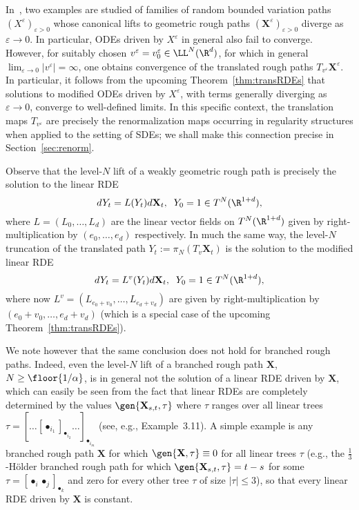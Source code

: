\documentclass{article}
\begin{document}
\begin{remark}\label{remark:BCF}
In~\cite{BCFForth}, two examples are studied of families of random bounded variation paths $(X^\varepsilon)_{\varepsilon > 0}$ whose canonical lifts to geometric rough paths $(\mathbf{X}^\varepsilon)_{\varepsilon > 0}$ diverge as $\varepsilon \rightarrow 0$. In particular, ODEs driven by $X^\varepsilon$ in general also fail to converge. However, for suitably chosen $v^\varepsilon = v^\varepsilon_0 \in \LL^N(\R^{d})$, for which in general $\lim_{\varepsilon\rightarrow 0}|v^\varepsilon| = \infty$, one obtains convergence of the translated rough paths $T_{v^\varepsilon}\mathbf{X}^\varepsilon$. In particular, it follows from the upcoming Theorem~\ref{thm:transRDEs} that solutions to modified ODEs driven by $X^\varepsilon$, with terms generally diverging as $\varepsilon \rightarrow 0$, converge to well-defined limits. In this specific context, the translation maps $T_{v^\varepsilon}$ are precisely the renormalization maps occurring in regularity structures when applied to the setting of SDEs; we shall make this connection precise in Section~\ref{sec:renorm}.
\end{remark}


\begin{remark}
Observe that the level-$N$ lift of a weakly geometric rough path is precisely the solution to the linear RDE
\[
dY_t = L(Y_t)d\mathbf{X}_t, \; \; Y_0 = 1 \in T^N(\R^{1+d}),
\]
where $L = (L_0,\ldots,L_d)$ are the linear vector fields on $T^N(\R^{1+d})$ given by right-multiplication by $(e_0,\ldots, e_d)$ respectively.
In much the same way, the level-$N$ truncation of the translated path $Y_t := \pi_N(T_v\mathbf{X}_t)$ is the solution to the modified linear RDE 
\[
dY_t = L^v(Y_t) d\mathbf{X}_t, \; \; Y_0 = 1 \in T^N(\R^{1+d}),
\]
where now $L^v = (L_{e_0 + v_0},\ldots,L_{e_d + v_d})$ are given by right-multiplication by $(e_0 + v_0,\ldots, e_d + v_d)$ (which is a special case of the upcoming Theorem~\ref{thm:transRDEs}).

We note however that the same conclusion does not hold for branched rough paths. Indeed, even the level-$N$ lift of a branched rough path $\mathbf{X}$, $N \geq \floor{1/\alpha}$, is in general not the solution of a linear RDE driven by $\mathbf{X}$, which can easily be seen from the fact that linear RDEs are completely determined by the values $\gen{\mathbf{X}_{s,t}, \tau}$ where $\tau$ ranges over all linear trees $\tau = [\ldots[\bullet_{i_1}]_{\bullet_{i_2}}\ldots]_{\bullet_{i_m}}$ (see, e.g., \cite{HairerKelly15} Example~3.11). A simple example is any branched rough path $\mathbf{X}$ for which $\gen{\mathbf{X}, \tau} \equiv 0$ for all linear trees $\tau$ (e.g., the $\frac{1}{3}$-H{\"o}lder branched rough path for which $\gen{\mathbf{X}_{s,t}, \tau} = t-s$ for some $\tau = [\bullet_i\bullet_j]_{\bullet_k}$ and zero for every other tree $\tau$ of size $|\tau| \leq 3$), so that every linear RDE driven by $\mathbf{X}$ is constant.
\end{remark}
\end{document}
